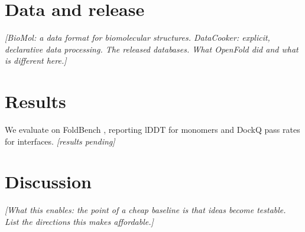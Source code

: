 \documentclass[11pt]{article}
\newcommand{\todo}[1]{{\color{draft}\itshape\small[#1]}}
\begin{document}
\section{Data and release}
\label{sec:release}
\todo{BioMol: a data format for biomolecular structures. DataCooker: explicit,
declarative data processing. The released databases. What OpenFold
\citep{openfold} did and what is different here.}

\section{Results}
We evaluate on FoldBench \citep{foldbench}, reporting lDDT \citep{lddt} for
monomers and DockQ \citep{dockqv2} pass rates for interfaces.
\todo{results pending}

\section{Discussion}
\todo{What this enables: the point of a cheap baseline is that ideas become
testable. List the directions this makes affordable.}

\small


\end{document}

